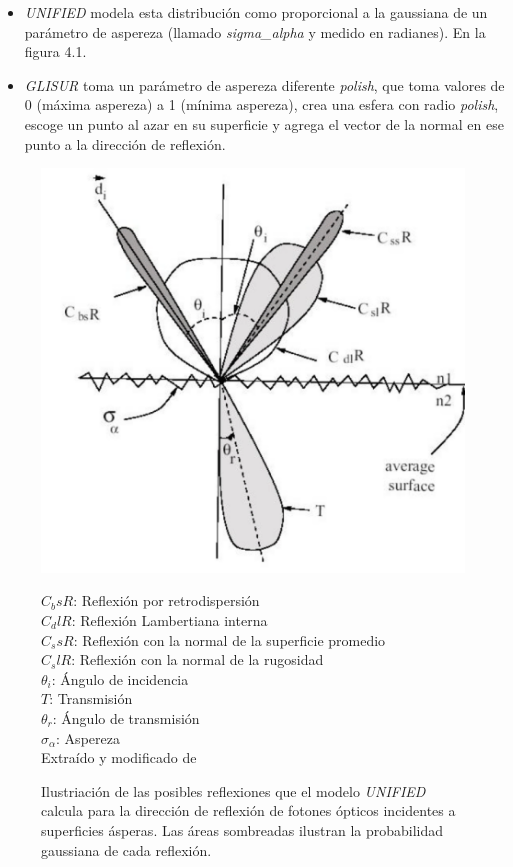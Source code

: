 \documentclass{book}
\begin{document}
\begin{itemize}
\item \textit{UNIFIED} modela esta distribuci\'on como proporcional a la gaussiana de un par\'ametro de aspereza (llamado \textit{sigma\_alpha} y medido en radianes). En la figura 4.1.
\item \textit{GLISUR}	toma un par\'ametro de aspereza diferente \textit{polish}, que toma valores de 0 (m\'axima aspereza) a 1 (m\'inima aspereza), crea una esfera con radio \textit{polish}, escoge un punto al azar en su superficie y agrega el vector de la normal en ese punto a la direcci\'on de reflexi\'on.
\end{itemize}

\begin{figure}[h] %
\begin{center}
 \includegraphics[width = 0.8\linewidth]{UNIFIED.png}
 
 $C_bsR$: Reflexi\'on por retrodispersi\'on\\
 $C_dlR$: Reflexi\'on Lambertiana interna\\
 $C_ssR$: Reflexi\'on con la normal de la superficie promedio\\
 $C_slR$: Reflexi\'on con la normal de la rugosidad\\
 $\theta_i$: \'Angulo de incidencia\\
 $T$: Transmisi\'on\\
 $\theta_r$: \'Angulo de transmisi\'on\\
 $\sigma_\alpha$: Aspereza\\
 Extra\'ido y modificado de \citep{GUMP}
\caption{Ilustriaci\'on de las posibles reflexiones que el modelo \textit{UNIFIED} calcula para la direcci\'on de reflexi\'on de fotones \'opticos incidentes a superficies \'asperas. Las \'areas sombreadas ilustran la probabilidad gaussiana de cada reflexi\'on.}
\end{center}
\end{figure}
\end{document}
